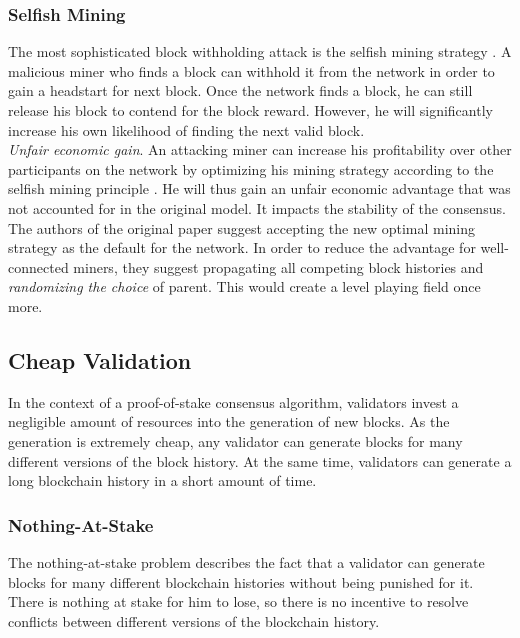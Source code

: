 \documentclass[12pt,a4paper]{article}
\begin{document}
\subsubsection{Selfish Mining}

The most sophisticated block withholding attack is the selfish mining strategy \cite{selfish}. A malicious miner who finds a block can withhold it from the network in order to gain a headstart for next block. Once the network finds a block, he can still release his block to contend for the block reward. However, he will significantly increase his own likelihood of finding the next valid block.\\

\textit{Unfair economic gain}. An attacking miner can increase his profitability over other participants on the network by optimizing his mining strategy according to the selfish mining principle \cite{optimal}. He will thus gain an unfair economic advantage that was not accounted for in the original model. It impacts the stability of the \gls{consensus}.\\

The authors of the original paper suggest accepting the new optimal mining strategy as the default for the network. In order to reduce the advantage for well-connected miners, they suggest propagating all competing block histories and \textit{randomizing the choice} of parent. This would create a level playing field once more.\\

\subsection{Cheap Validation}

In the context of a proof-of-stake consensus algorithm, \glspl{validator} invest a negligible amount of resources into the generation of new \glspl{block}. As the generation is extremely cheap, any \gls{validator} can generate \glspl{block} for many different versions of the block history. At the same time, \glspl{validator} can generate a long blockchain history in a short amount of time.\\

\subsubsection{Nothing-At-Stake}

The nothing-at-stake problem describes the fact that a \gls{validator} can generate \glspl{block} for many different blockchain histories without being punished for it. There is nothing at stake for him to lose, so there is no incentive to resolve conflicts between different versions of the blockchain history.\\
\end{document}
